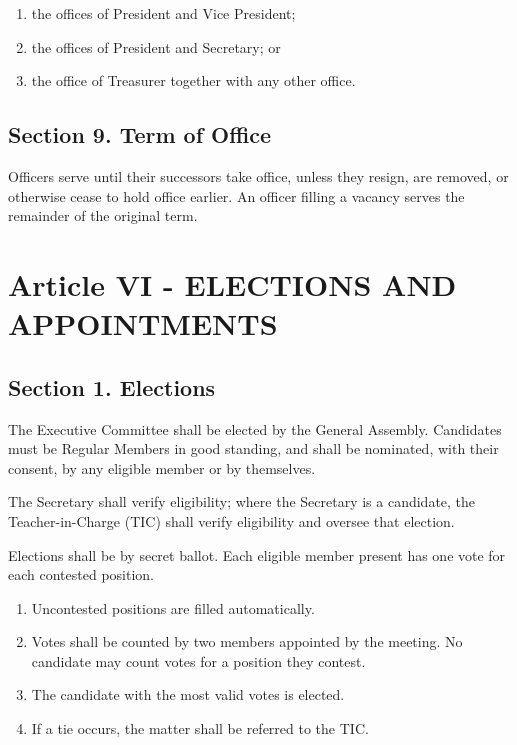 \documentclass[a4paper]{article}
\begin{document}
\begin{enumerate}[leftmargin=*]
  \item the offices of President and Vice President;
  \item the offices of President and Secretary; or
  \item the office of Treasurer together with any other office.
\end{enumerate}

\subsection*{Section 9. Term of Office}
Officers serve until their successors take office, unless they resign, are removed, or otherwise cease to hold office earlier. An officer filling a vacancy serves the remainder of the original term.

\section*{Article VI - ELECTIONS AND APPOINTMENTS}

\subsection*{Section 1. Elections}
The Executive Committee shall be elected by the General Assembly. Candidates must be
Regular Members in good standing, and shall be nominated, with their consent, by any
eligible member or by themselves.

The Secretary shall verify eligibility; where the Secretary is a candidate, the
Teacher-in-Charge (TIC) shall verify eligibility and oversee that election.

Elections shall be by secret ballot. Each eligible member present has one vote for each
contested position.

\begin{enumerate}
    \item Uncontested positions are filled automatically.
    \item Votes shall be counted by two members appointed by the meeting. No candidate
    may count votes for a position they contest.
    \item The candidate with the most valid votes is elected.
    \item If a tie occurs, the matter shall be referred to the TIC.
\end{enumerate}
\end{document}
